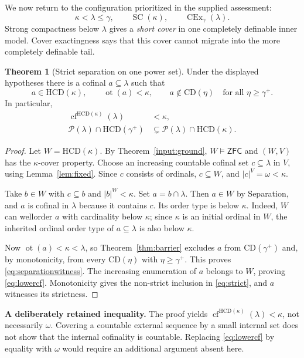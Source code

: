 \documentclass[11pt,letterpaper]{article}
\theoremstyle{definition}
\newtheorem{theorem}[definition]{Theorem}
\newcommand{\ZFC}{\mathsf{ZFC}}
\newcommand{\SC}{\operatorname{SC}}
\newcommand{\CEx}{\operatorname{CEx}}
\newcommand{\cf}{\operatorname{cf}}
\newcommand{\ot}{\operatorname{ot}}
\newcommand{\CD}{\mathrm{CD}}
\newcommand{\HCD}{\mathrm{HCD}}
\newcommand{\Pow}{\mathcal{P}}
\begin{document}
We now return to the configuration prioritized in the supplied assessment:
\[
        \kappa<\lambda\leq\gamma,
        \qquad \SC(\kappa),\qquad \CEx_\gamma(\lambda).
\]
Strong compactness below $\lambda$ gives a \emph{short cover} in one completely definable inner model. Cover exactingness says that this cover cannot migrate into the more completely definable tail.

\begin{theorem}[Strict separation on one power set]\label{thm:separation}
Under the displayed hypotheses there is a cofinal $a\subseteq\lambda$ such that
\begin{equation}\label{eq:separationwitness}
  a\in\HCD(\kappa),\qquad \ot(a)<\kappa,
  \qquad a\notin\CD(\eta)\quad\text{for all }\eta\geq\gamma^+.
\end{equation}
In particular,
\begin{align}
 \cf^{\HCD(\kappa)}(\lambda)&<\kappa,\label{eq:lowercf}\\
 \Pow(\lambda)\cap\HCD(\gamma^+)
   &\subsetneq\Pow(\lambda)\cap\HCD(\kappa).\label{eq:strict}
\end{align}
\end{theorem}

\begin{proof}
Let $W=\HCD(\kappa)$. By Theorem~\ref{input:ground}, $W\models\ZFC$ and $(W,V)$ has the $\kappa$-cover property. Choose an increasing countable cofinal set $c\subseteq\lambda$ in $V$, using Lemma~\ref{lem:fixed}. Since $c$ consists of ordinals, $c\subseteq W$, and $|c|^V=\omega<\kappa$.

Take $b\in W$ with $c\subseteq b$ and $|b|^W<\kappa$. Set $a=b\cap\lambda$. Then $a\in W$ by Separation, and $a$ is cofinal in $\lambda$ because it contains $c$. Its order type is below $\kappa$. Indeed, $W$ can wellorder $a$ with cardinality below $\kappa$; since $\kappa$ is an initial ordinal in $W$, the inherited ordinal order type of $a\subseteq\lambda$ is also below $\kappa$.

Now $\ot(a)<\kappa<\lambda$, so Theorem~\ref{thm:barrier} excludes $a$ from $\CD(\gamma^+)$ and, by monotonicity, from every $\CD(\eta)$ with $\eta\geq\gamma^+$. This proves \eqref{eq:separationwitness}. The increasing enumeration of $a$ belongs to $W$, proving \eqref{eq:lowercf}. Monotonicity gives the non-strict inclusion in \eqref{eq:strict}, and $a$ witnesses its strictness.
\end{proof}

\textbf{A deliberately retained inequality.} The proof yields $\cf^{\HCD(\kappa)}(\lambda)<\kappa$, not necessarily $\omega$. Covering a countable external sequence by a small internal set does not show that the internal cofinality is countable. Replacing \eqref{eq:lowercf} by equality with $\omega$ would require an additional argument absent here.
\end{document}

